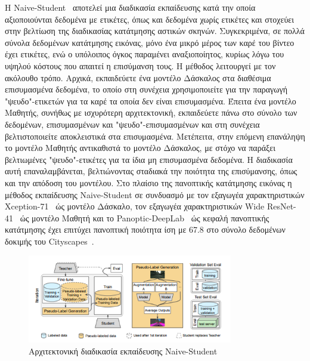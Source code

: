 \documentclass[12pt]{article}
\numberwithin{equation}{section}
\begin{document}
H Naive-Student~\cite{chen2020naivestudentleveragingsemisupervisedlearning} αποτελεί μια διαδικασία εκπαίδευσης κατά την οποία αξιοποιούνται δεδομένα με ετικέτες, όπως και δεδομένα χωρίς ετικέτες και στοχεύει στην βελτίωση της διαδικασίας κατάτμησης αστικών σκηνών. Συγκεκριμένα, σε πολλά σύνολα δεδομένων κατάτμησης εικόνας, μόνο ένα μικρό μέρος των καρέ του βίντεο έχει ετικέτες, ενώ ο υπόλοιπος όγκος παραμένει αναξιοποίητος, κυρίως λόγω του υψηλού κόστους που απαιτεί η επισύμανση τους. Η μέθοδος λειτουργεί με τον ακόλουθο τρόπο. Αρχικά, εκπαιδεύετε ένα μοντέλο Δάσκαλος στα διαθέσιμα επισυμασμένα δεδομένα, το οποίο στη συνέχεια χρησιμοποιείτε για την παραγωγή "ψευδο"-ετικετών για τα καρέ τα οποία δεν είναι επισυμασμένα. Έπειτα ένα μοντέλο Μαθητής, συνήθως με ισχυρότερη αρχιτεκτονική, εκπαιδεύετε πάνω στο σύνολο των δεδομένων, επισυμασμένων και "ψευδο"-επισυμασμένων και στη συνέχεια βελτιστοποιείτε αποκλειστικά στα επισυμασμένα. Μετέπειτα, στην επόμενη επανάληψη το μοντέλο Μαθητής αντικαθιστά το μοντέλο Δάσκαλος, με στόχο να παράξει βελτιωμένες "ψευδο"-ετικέτες για τα ίδια μη επισυμασμένα δεδομένα. Η διαδικασία αυτή επαναλαμβάνεται, βελτιώνοντας σταδιακά την ποιότητα της επισύμανσης, όπως και την απόδοση του μοντέλου. Στο πλαίσιο της πανοπτικής κατάτμησης εικόνας η μέθοδος εκπαίδευσης Naive-Student σε συνδυασμό με τον εξαγωγέα χαρακτηριστικών Xception-71~\cite{chollet2017xceptiondeeplearningdepthwise} ώς μοντέλο Δάσκαλο, τον εξαγωγέα χαρακτηριστικών Wide ResNet-41~\cite{chen2021scalingwideresidualnetworks} ώς μοντέλο Μαθητή και το Panoptic-DeepLab~\cite{cheng2020panopticdeeplabsimplestrongfast} ώς κεφαλή πανοπτικής κατάτμησης έχει επιτύχει πανοπτική ποιότητα ίση με 67.8 στο σύνολο δεδομένων δοκιμής του Cityscapes~\cite{DBLP:journals/corr/CordtsORREBFRS16}.\\

\begin{figure}[h!]
  \centering
  \includegraphics[width=0.8\textwidth]{images/Naive-Student.png} %
  \caption{Αρχιτεκτονική διαδικασία εκπαίδευσης Naive-Student}
  \label{figure 20}
\end{figure} 
\end{document}

